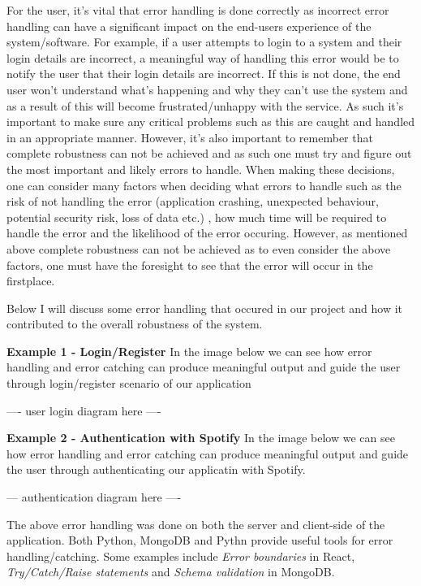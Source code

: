     For the user, it's vital that error handling is done correctly as incorrect error handling can have a significant impact on the end-users experience of the system/software. For example, if a user
    attempts to login to a system and their login details are incorrect, a meaningful way of handling this error would be to notify the user that their login details are incorrect. If this is not done, 
    the end user won't understand what's happening and why they can't use the system and as a result of this will become frustrated/unhappy with the service. As such it's important to make sure any critical
    problems such as this are caught and handled in an appropriate manner. However, it's also important to remember that complete robustness can not be achieved and as such one must try and figure out the 
    most important and likely errors to handle. When making these decisions, one can consider many factors when deciding what errors to handle such as the risk of not handling the error (application crashing, unexpected behaviour, potential security risk, loss of data etc.)
    , how much time will be required to handle the error and the likelihood of the error occuring. However, as mentioned above complete robustness can not be achieved as to even consider the above factors,
    one must have the foresight to see that the error will occur in the firstplace.

    Below I will discuss some error handling that occured in our project and how it contributed to the overall robustness of the system.
    
    \textbf{Example 1 - Login/Register} 
    In the image below we can see how error handling and error catching can produce meaningful output and guide the user through login/register scenario of our application

    ---- user login diagram here ----

    \textbf{Example 2 - Authentication with Spotify}
    In the image below we can see how error handling and error catching can produce meaningful output and guide the user through authenticating our applicatin with Spotify.

    --- authentication diagram here ----


    The above error handling was done on both the server and client-side of the application. Both Python, MongoDB and Pythn provide useful tools for error handling/catching.
    Some examples include \textit{Error boundaries} in React, \textit{Try/Catch/Raise statements} and \textit{Schema validation} in MongoDB.

